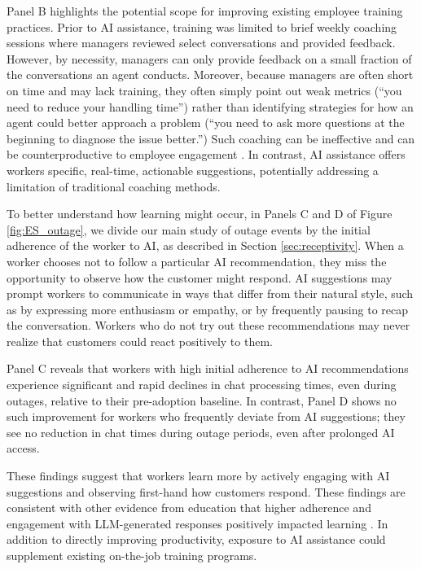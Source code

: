 \documentclass[11pt]{article}
\begin{document}
Panel B highlights the potential scope for improving existing employee training practices. Prior to AI assistance, training was limited to brief weekly coaching sessions where managers reviewed select conversations and provided feedback. However, by necessity, managers can only provide feedback on a small fraction of the conversations an agent conducts.  Moreover, because managers are often short on time and may lack training, they often simply point out weak metrics (``you need to reduce your handling time'') rather than identifying strategies for how an agent could better approach a problem (``you need to ask more questions at the beginning to diagnose the issue better.'') Such coaching can be ineffective and can be counterproductive to employee engagement \citep{berg2018}. In contrast, AI assistance offers workers specific, real-time, actionable suggestions, potentially addressing a limitation of traditional coaching methods.

To better understand how learning might occur, in Panels C and D of Figure \ref{fig:ES_outage}, we divide our main study of outage events by the initial adherence of the worker to AI, as described in Section \ref{sec:receptivity}. When a worker chooses not to follow a particular AI recommendation, they miss the opportunity to observe how the customer might respond.  AI suggestions may prompt workers to communicate in ways that differ from their natural style, such as by expressing more enthusiasm or empathy, or by frequently pausing to recap the conversation.  Workers who do not try out these recommendations may never realize that customers could react positively to them.

Panel C reveals that workers with high initial adherence to AI recommendations experience significant and rapid declines in chat processing times, even during outages, relative to their pre-adoption baseline. In contrast, Panel D shows no such improvement for workers who frequently deviate from AI suggestions; they see no reduction in chat times during outage periods, even after prolonged AI access.  

These findings suggest that workers learn more by actively engaging with AI suggestions and observing first-hand how customers respond. These findings are consistent with other evidence from education that higher adherence and engagement with LLM-generated responses positively impacted learning \citep{kuman2023}. In addition to directly improving productivity, exposure to AI assistance could supplement existing on-the-job training programs. 
\end{document}
